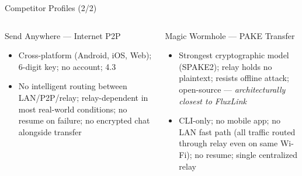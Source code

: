 \documentclass[xcolor=table,dvipsnames,svgnames,aspectratio=169]{beamer}
\begin{document}
\begin{frame}[shrink=12]{Competitor Profiles (2/2)}
  \begin{columns}[t]
    \begin{block}{Send Anywhere --- Internet P2P}
      \begin{itemize}
        \item[\faPlus] Cross-platform (Android, iOS, Web); 6-digit key; no account; 4.3\faAndroid
        \item[\faMinus] No intelligent routing between LAN/P2P/relay; relay-dependent in most real-world conditions; no resume on failure; no encrypted chat alongside transfer
      \end{itemize}
    \end{block}
    \begin{block}{Magic Wormhole --- PAKE Transfer}
      \begin{itemize}
        \item[\faPlus] Strongest cryptographic model (SPAKE2); relay holds no plaintext; resists offline attack; open-source --- \textit{architecturally closest to FluxLink}
        \item[\faMinus] CLI-only; no mobile app; no LAN fast path (all traffic routed through relay even on same Wi-Fi); no resume; single centralized relay
      \end{itemize}
    \end{block}
  \end{columns}
\end{frame}
\end{document}

